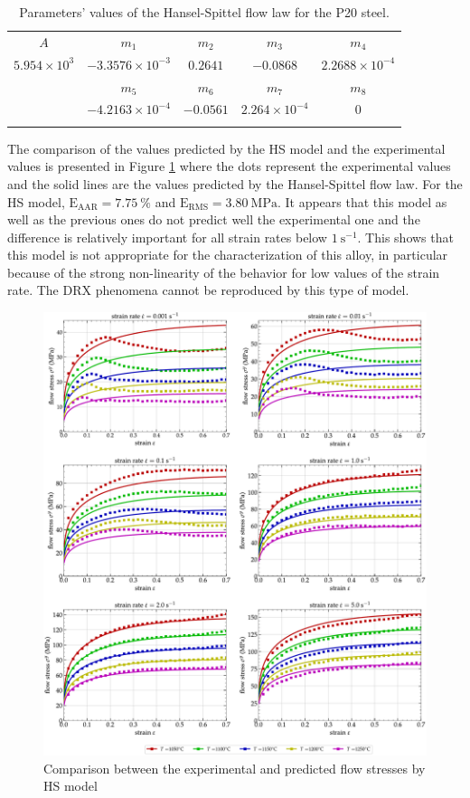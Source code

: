 \documentclass[twoside,english,1p,final,sort&compress]{elsarticle}
\theoremstyle{plain}
\DeclareRobustCommand{\RMSE}{\text{E}_\text{RMS}}
\DeclareRobustCommand{\AARE}{\text{E}_\text{AAR}}
\DeclareRobustCommand{\ps}{\text{s}^{-1}}
\begin{document}
\begin{table}[h!]
\centering
\caption{Parameters' values of the Hansel-Spittel flow law for the P20 steel.}
\begin{tabular}{ccccc}
\hline
$A$ & $m_1$ & $m_2$ & $m_3$ & $m_4$\\
$5.954\times 10^{3}$ & $-3.3576\times10^{-3}$ & $0.2641$ & $-0.0868$ & $2.2688\times10^{-4}$\\\hline
& $m_5$ & $m_6$ & $m_7$ & $m_8$\\
& $-4.2163\times10^{-4}$ & $-0.0561$ & $2.264\times10^{-4}$ & $0$\\\hline
\label{tab:HS}
\end{tabular}
\end{table}

The comparison of the values predicted by the HS model and the experimental values is presented in Figure \ref{fig:CompExp-HS-6} where the dots represent the experimental values and the solid lines are the values predicted by the Hansel-Spittel flow law.
For the HS model, $\AARE=7.75~\%$ and $\RMSE=3.80~\text{MPa}$.
It appears that this model as well as the previous ones do not predict well the experimental one and the difference is relatively important for all strain rates below $1~\ps$.
This shows that this model is not appropriate for the characterization of this alloy, in particular because of the strong non-linearity of the behavior for low values of the strain rate.
The DRX phenomena cannot be reproduced by this type of model.

\begin{figure}[!ht]
\centering
\includegraphics[width=\columnwidth]
{Figures/CompExp-HS-6}
\caption{Comparison between the experimental and predicted flow stresses by HS model}
\label{fig:CompExp-HS-6}
\end{figure}
\end{document}
